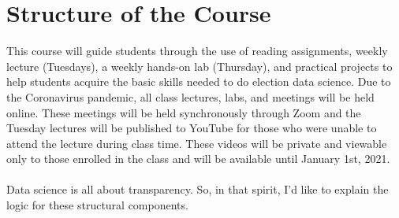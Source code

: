 \documentclass[11pt]{article}
\begin{document}
\section{Structure of the Course}
This course will guide students through the use of reading assignments, weekly lecture (Tuesdays), a weekly hands-on lab (Thursday), and practical projects to help students acquire the basic skills needed to do election data science. Due to the Coronavirus pandemic, all class lectures, labs, and meetings will be held online. These meetings will be held synchronously through Zoom and the Tuesday lectures will be published to YouTube for those who were unable to attend the lecture during class time. These videos will be private and viewable only to those enrolled in the class and will be available until January 1st, 2021. 
\\\\
Data science is all about transparency. So, in that spirit, I'd like to explain the logic for these structural components. 
\end{document}
